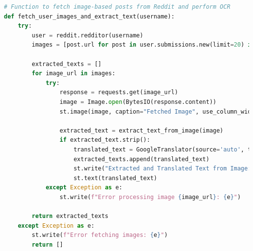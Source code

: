 \begin{tcolorbox}[colback=gray!5!white, colframe=gray!80!black, boxrule=0.5pt, title=Fetching Image-Based Posts from Reddit and Performing OCR]
    \begin{lstlisting}[language=Python]
# Function to fetch image-based posts from Reddit and perform OCR
def fetch_user_images_and_extract_text(username):
    try:
        user = reddit.redditor(username)
        images = [post.url for post in user.submissions.new(limit=20) if post.url.endswith(('.jpg', '.jpeg', '.png', '.webp', '.bmp', '.tiff'))]

        extracted_texts = []
        for image_url in images:
            try:
                response = requests.get(image_url)
                image = Image.open(BytesIO(response.content))
                st.image(image, caption="Fetched Image", use_column_width=True)

                extracted_text = extract_text_from_image(image)
                if extracted_text.strip():
                    translated_text = GoogleTranslator(source='auto', target='en').translate(extracted_text)
                    extracted_texts.append(translated_text)
                    st.write("Extracted and Translated Text from Image:")
                    st.text(translated_text)
            except Exception as e:
                st.write(f"Error processing image {image_url}: {e}")

        return extracted_texts
    except Exception as e:
        st.write(f"Error fetching images: {e}")
        return []
    \end{lstlisting}
\end{tcolorbox}

